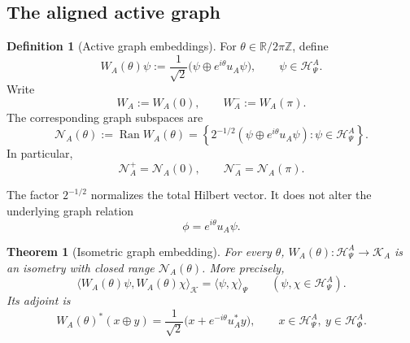 \documentclass[11pt,reqno]{scrartcl}
\newcommand{\RR}{\mathbb R}
\newcommand{\ZZ}{\mathbb Z}
\newcommand{\scrK}{\mathscr K}
\newcommand{\polA}{u_A}
\newcommand{\inner}[2]{\langle #1,#2\rangle}
\DeclareMathOperator{\Ran}{Ran}
\newcommand{\actHP}{\mathscr H_{\Psi}^{A}}
\newcommand{\actHF}{\mathscr H_{\Phi}^{A}}
\newcommand{\actK}{\mathscr K_{A}}
\newcommand{\NAplus}{\mathscr N_{A}^{+}}
\newcommand{\NAminus}{\mathscr N_{A}^{-}}
\newcommand{\NAtheta}{\mathscr N_{A}(\theta)}
\newcommand{\WA}{W_{A}}
\newcommand{\WAtheta}{W_{A}(\theta)}
\theoremstyle{plain}
\newtheorem{theorem}{Theorem}[section]
\theoremstyle{definition}
\newtheorem{definition}[definition]{Definition}
\theoremstyle{remark}
\begin{document}
\subsection{The aligned active graph}

\begin{definition}[Active graph embeddings]
\label{def:active-graph-embeddings}
For \(\theta\in\RR/2\pi\ZZ\), define
\begin{equation}
  \boxed{
  \WAtheta\psi
  :=\frac1{\sqrt2}
    \bigl(\psi\oplus e^{i\theta}\polA\psi\bigr),
  \qquad
  \psi\in\actHP.}
  \label{eq:WA-theta-definition}
\end{equation}
Write
\begin{equation}
  \WA:=W_A(0),
  \qquad
  W_A^-:=W_A(\pi).
  \label{eq:WA-plus-minus}
\end{equation}
The corresponding graph subspaces are
\begin{equation}
  \NAtheta:=\Ran\WAtheta
  =\left\{
  2^{-1/2}(\psi\oplus e^{i\theta}\polA\psi):
  \psi\in\actHP
  \right\}.
  \label{eq:NA-theta-definition}
\end{equation}
In particular,
\begin{equation}
  \NAplus=\mathscr N_A(0),
  \qquad
  \NAminus=\mathscr N_A(\pi).
  \label{eq:NA-plus-minus-def}
\end{equation}
\end{definition}

The factor \(2^{-1/2}\) normalizes the total Hilbert vector.  It does not
alter the underlying graph relation
\begin{equation}
  \phi=e^{i\theta}\polA\psi.
  \label{eq:active-graph-relation}
\end{equation}

\begin{theorem}[Isometric graph embedding]
\label{thm:WA-isometry}
For every \(\theta\), \(\WAtheta:\actHP\to\actK\) is an isometry with
closed range \(\NAtheta\).  More precisely,
\begin{equation}
  \inner{\WAtheta\psi}{\WAtheta\chi}_{\scrK}
  =\inner{\psi}{\chi}_{\Psi}
  \qquad
  (\psi,\chi\in\actHP).
  \label{eq:WA-inner-preservation}
\end{equation}
Its adjoint is
\begin{equation}
  \WAtheta^*(x\oplus y)
  =\frac1{\sqrt2}
   \bigl(x+e^{-i\theta}\polA^*y\bigr),
  \qquad x\in\actHP,\ y\in\actHF.
  \label{eq:WA-adjoint}
\end{equation}
\end{theorem}
\end{document}
